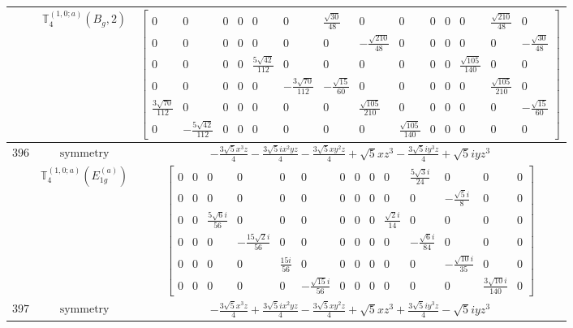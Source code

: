 \documentclass[fleqn,8pt,landscape]{jsarticle}
\begin{document}
\begin{longtable}{ccc}
$  $ & $ \mathbb{T}_{4}^{(1,0;a)}(B_{g},2) $ & $ \begin{bmatrix} 0 & 0 & 0 & 0 & 0 & 0 & \frac{\sqrt{30}}{48} & 0 & 0 & 0 & 0 & 0 & \frac{\sqrt{210}}{48} & 0 \\ 0 & 0 & 0 & 0 & 0 & 0 & 0 & - \frac{\sqrt{210}}{48} & 0 & 0 & 0 & 0 & 0 & - \frac{\sqrt{30}}{48} \\ 0 & 0 & 0 & 0 & \frac{5 \sqrt{42}}{112} & 0 & 0 & 0 & 0 & 0 & 0 & \frac{\sqrt{105}}{140} & 0 & 0 \\ 0 & 0 & 0 & 0 & 0 & - \frac{3 \sqrt{70}}{112} & - \frac{\sqrt{15}}{60} & 0 & 0 & 0 & 0 & 0 & \frac{\sqrt{105}}{210} & 0 \\ \frac{3 \sqrt{70}}{112} & 0 & 0 & 0 & 0 & 0 & 0 & \frac{\sqrt{105}}{210} & 0 & 0 & 0 & 0 & 0 & - \frac{\sqrt{15}}{60} \\ 0 & - \frac{5 \sqrt{42}}{112} & 0 & 0 & 0 & 0 & 0 & 0 & \frac{\sqrt{105}}{140} & 0 & 0 & 0 & 0 & 0 \end{bmatrix} $ \\ \hline
$ 396 $ & $ \text{symmetry} $ & $ - \frac{3 \sqrt{5} x^{3} z}{4} - \frac{3 \sqrt{5} i x^{2} y z}{4} - \frac{3 \sqrt{5} x y^{2} z}{4} + \sqrt{5} x z^{3} - \frac{3 \sqrt{5} i y^{3} z}{4} + \sqrt{5} i y z^{3} $ \\
$  $ & $ \mathbb{T}_{4}^{(1,0;a)}(E_{1g}^{(a)}) $ & $ \begin{bmatrix} 0 & 0 & 0 & 0 & 0 & 0 & 0 & 0 & 0 & 0 & \frac{5 \sqrt{3} i}{24} & 0 & 0 & 0 \\ 0 & 0 & 0 & 0 & 0 & 0 & 0 & 0 & 0 & 0 & 0 & - \frac{\sqrt{5} i}{8} & 0 & 0 \\ 0 & 0 & \frac{5 \sqrt{6} i}{56} & 0 & 0 & 0 & 0 & 0 & 0 & \frac{\sqrt{2} i}{14} & 0 & 0 & 0 & 0 \\ 0 & 0 & 0 & - \frac{15 \sqrt{2} i}{56} & 0 & 0 & 0 & 0 & 0 & 0 & - \frac{\sqrt{6} i}{84} & 0 & 0 & 0 \\ 0 & 0 & 0 & 0 & \frac{15 i}{56} & 0 & 0 & 0 & 0 & 0 & 0 & - \frac{\sqrt{10} i}{35} & 0 & 0 \\ 0 & 0 & 0 & 0 & 0 & - \frac{\sqrt{15} i}{56} & 0 & 0 & 0 & 0 & 0 & 0 & \frac{3 \sqrt{10} i}{140} & 0 \end{bmatrix} $ \\ \hline
$ 397 $ & $ \text{symmetry} $ & $ - \frac{3 \sqrt{5} x^{3} z}{4} + \frac{3 \sqrt{5} i x^{2} y z}{4} - \frac{3 \sqrt{5} x y^{2} z}{4} + \sqrt{5} x z^{3} + \frac{3 \sqrt{5} i y^{3} z}{4} - \sqrt{5} i y z^{3} $ \\

\end{longtable}
\end{document}
